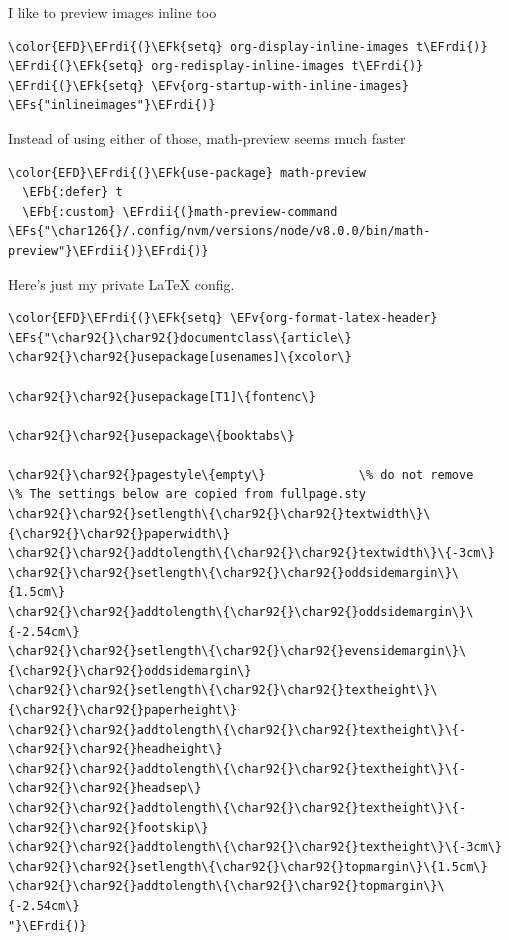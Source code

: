 \documentclass{scrartcl}
\newcommand{\EFk}[1]{\textcolor{EFk}{#1}} %
\newcommand{\EFs}[1]{\textcolor{EFs}{#1}} %
\newcommand{\EFb}[1]{\textcolor{EFb}{#1}} %
\newcommand{\EFv}[1]{\textcolor{EFv}{#1}} %
\newcommand{\EFrdi}[1]{\textcolor{EFrdi}{#1}} %
\newcommand{\EFrdii}[1]{\textcolor{EFrdii}{#1}} %
\begin{document}
I like to preview images inline too
\begin{Code}
\begin{Verbatim}[]
\color{EFD}\EFrdi{(}\EFk{setq} org-display-inline-images t\EFrdi{)}
\EFrdi{(}\EFk{setq} org-redisplay-inline-images t\EFrdi{)}
\EFrdi{(}\EFk{setq} \EFv{org-startup-with-inline-images} \EFs{"inlineimages"}\EFrdi{)}
\end{Verbatim}
\end{Code}

Instead of using either of those, math-preview seems much faster
\begin{Code}
\begin{Verbatim}[]
\color{EFD}\EFrdi{(}\EFk{use-package} math-preview
  \EFb{:defer} t
  \EFb{:custom} \EFrdii{(}math-preview-command \EFs{"\char126{}/.config/nvm/versions/node/v8.0.0/bin/math-preview"}\EFrdii{)}\EFrdi{)}
\end{Verbatim}
\end{Code}

Here's just my private \LaTeX{} config.
\begin{Code}
\begin{Verbatim}[]
\color{EFD}\EFrdi{(}\EFk{setq} \EFv{org-format-latex-header} \EFs{"\char92{}\char92{}documentclass\{article\}
\char92{}\char92{}usepackage[usenames]\{xcolor\}

\char92{}\char92{}usepackage[T1]\{fontenc\}

\char92{}\char92{}usepackage\{booktabs\}

\char92{}\char92{}pagestyle\{empty\}             \% do not remove
\% The settings below are copied from fullpage.sty
\char92{}\char92{}setlength\{\char92{}\char92{}textwidth\}\{\char92{}\char92{}paperwidth\}
\char92{}\char92{}addtolength\{\char92{}\char92{}textwidth\}\{-3cm\}
\char92{}\char92{}setlength\{\char92{}\char92{}oddsidemargin\}\{1.5cm\}
\char92{}\char92{}addtolength\{\char92{}\char92{}oddsidemargin\}\{-2.54cm\}
\char92{}\char92{}setlength\{\char92{}\char92{}evensidemargin\}\{\char92{}\char92{}oddsidemargin\}
\char92{}\char92{}setlength\{\char92{}\char92{}textheight\}\{\char92{}\char92{}paperheight\}
\char92{}\char92{}addtolength\{\char92{}\char92{}textheight\}\{-\char92{}\char92{}headheight\}
\char92{}\char92{}addtolength\{\char92{}\char92{}textheight\}\{-\char92{}\char92{}headsep\}
\char92{}\char92{}addtolength\{\char92{}\char92{}textheight\}\{-\char92{}\char92{}footskip\}
\char92{}\char92{}addtolength\{\char92{}\char92{}textheight\}\{-3cm\}
\char92{}\char92{}setlength\{\char92{}\char92{}topmargin\}\{1.5cm\}
\char92{}\char92{}addtolength\{\char92{}\char92{}topmargin\}\{-2.54cm\}
"}\EFrdi{)}
\end{Verbatim}
\end{Code}
\end{document}
